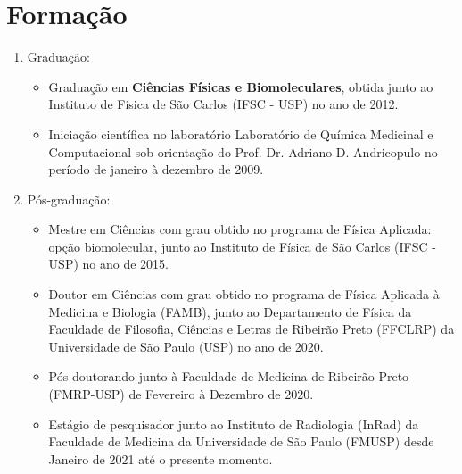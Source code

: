 \documentclass[a4paper,oneside,10pt]{article}
\begin{document}
\section{Formação}
\large{
\begin{enumerate}
        \item Graduação:
        \begin{itemize}
                \item Graduação em \textbf{Ciências Físicas e Biomoleculares}, obtida junto ao Instituto de Física de São Carlos (IFSC - USP) no ano de 2012. \mbox{} \\
                \item Iniciação científica no laboratório Laboratório de Química Medicinal e Computacional sob orientação do Prof. Dr. Adriano D. Andricopulo no período de janeiro à dezembro de 2009. \mbox{} \\ 
        \end{itemize}

        \item Pós-graduação:
        \begin{itemize}
                \item Mestre em Ciências com grau obtido no programa de Física Aplicada: opção biomolecular, junto ao Instituto de Física de São Carlos (IFSC - USP) no ano de 2015. \mbox{} \\
                \item Doutor em Ciências com grau obtido no programa de Física Aplicada à Medicina e Biologia (FAMB), junto ao Departamento de Física da Faculdade de Filosofia, Ciências e Letras de Ribeirão Preto (FFCLRP) da Universidade de São Paulo (USP) no ano de 2020. \mbox{} \\
                \item Pós-doutorando junto à Faculdade de Medicina de Ribeirão Preto (FMRP-USP) de Fevereiro à Dezembro de 2020. \mbox{}\\
                \item Estágio de pesquisador junto ao Instituto de Radiologia (InRad) da Faculdade de Medicina da Universidade de São Paulo (FMUSP) desde Janeiro de 2021 até o presente momento. \mbox{} \\
        \end{itemize}


\end{enumerate}}
\end{document}

